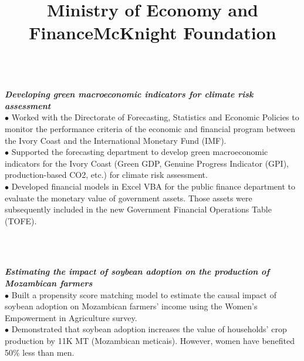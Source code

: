 \documentclass[overlapped]{res}
\begin{document}
\begin{resume}
\begin{position}
\end{position}
\title{\textbf{Ministry of Economy and Finance}}
\begin{position}\\[- 2 mm]
\textbf{\textit{Developing green macroeconomic indicators for climate risk assessment}}\\
$\bullet$ Worked with the Directorate of Forecasting, Statistics and Economic Policies to monitor the performance criteria of the economic and financial program between the Ivory Coast and the International Monetary Fund (IMF).\\
$\bullet$  Supported the forecasting department to develop green macroeconomic indicators for the Ivory Coast (Green GDP, Genuine Progress Indicator (GPI), production-based CO2, etc.) for climate risk assessment.\\
$\bullet$ Developed financial models in Excel VBA for the public finance department to evaluate the monetary value of government assets. Those assets were subsequently included in the new Government Financial Operations Table (TOFE).
\end{position}\\[-6.5 mm]
\title{\textbf{McKnight Foundation}}
\begin{position}\\[-2 mm]
\textbf{\textit{Estimating the impact of soybean adoption on the production of Mozambican farmers}}\\
$\bullet$ Built a propensity score matching model to estimate the causal impact of soybean adoption on Mozambican farmers' income using the Women's Empowerment in Agriculture survey.\\
$\bullet$ Demonstrated that soybean adoption increases the value of households' crop production by 11K MT (Mozambican meticais). However, women have benefited 50\% less than men.
\end{position}

\end{resume}
\end{document}
